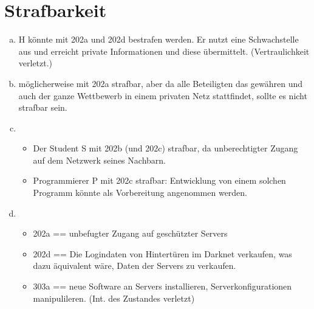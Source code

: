 \documentclass[12pt]{article}
\begin{document}
    \section{Strafbarkeit}

    \begin{enumerate}[(a)]
        \item H könnte mit 202a und 202d bestrafen werden. Er nutzt eine Schwachstelle aus und erreicht private Informationen und diese übermittelt. (Vertraulichkeit verletzt.)
        \item möglicherweise mit 202a strafbar, aber da alle Beteiligten das gewähren und auch der ganze Wettbewerb in einem privaten Netz stattfindet, sollte es nicht strafbar sein.
        \item 
        \begin{itemize}
            \item Der Student S mit 202b (und 202c) strafbar, da unberechtigter Zugang auf dem Netzwerk seines Nachbarn.
            \item Programmierer P mit 202c strafbar: Entwicklung von einem solchen Programm könnte als Vorbereitung angenommen werden.
        \end{itemize}
        \item
        \begin{itemize}
            \item 202a == unbefugter Zugang auf geschützter Servers
            \item 202d == Die Logindaten von Hintertüren im Darknet verkaufen, was dazu äquivalent wäre, Daten der Servers zu verkaufen.
            \item 303a == neue Software an Servers installieren, Serverkonfigurationen manipulileren. (Int. des Zustandes verletzt)
        \end{itemize}    
    \end{enumerate}    
\end{document}
